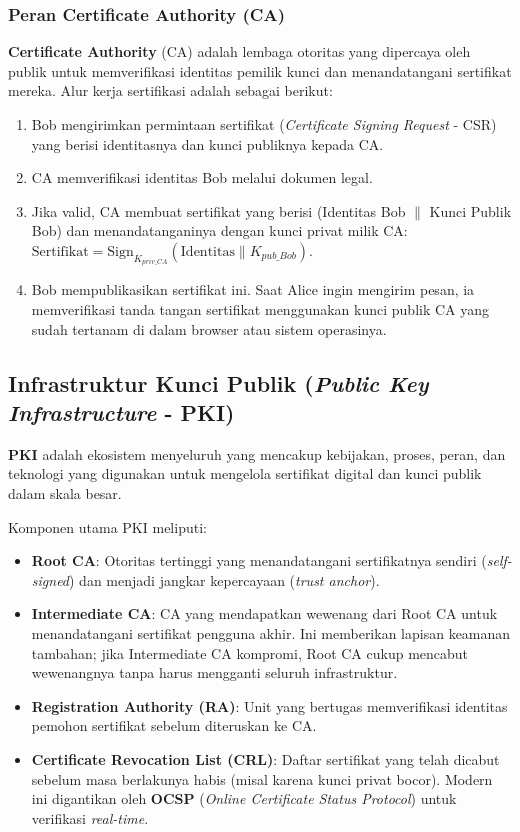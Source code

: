 \subsubsection{Peran Certificate Authority (CA)}
\textbf{Certificate Authority} (CA) adalah lembaga otoritas yang dipercaya oleh publik untuk memverifikasi identitas pemilik kunci dan menandatangani sertifikat mereka. Alur kerja sertifikasi adalah sebagai berikut:
\begin{enumerate}
    \item Bob mengirimkan permintaan sertifikat (\textit{Certificate Signing Request} - CSR) yang berisi identitasnya dan kunci publiknya kepada CA.
    \item CA memverifikasi identitas Bob melalui dokumen legal.
    \item Jika valid, CA membuat sertifikat yang berisi (Identitas Bob $\parallel$ Kunci Publik Bob) dan menandatanganinya dengan kunci privat milik CA: $\text{Sertifikat} = \text{Sign}_{K_{priv\_CA}}(\text{Identitas} \parallel K_{pub\_Bob})$.
    \item Bob mempublikasikan sertifikat ini. Saat Alice ingin mengirim pesan, ia memverifikasi tanda tangan sertifikat menggunakan kunci publik CA yang sudah tertanam di dalam browser atau sistem operasinya.
\end{enumerate}

\subsection{Infrastruktur Kunci Publik (\textit{Public Key Infrastructure} - PKI)}

\textbf{PKI} adalah ekosistem menyeluruh yang mencakup kebijakan, proses, peran, dan teknologi yang digunakan untuk mengelola sertifikat digital dan kunci publik dalam skala besar.

Komponen utama PKI meliputi:
\begin{itemize}
    \item \textbf{Root CA}: Otoritas tertinggi yang menandatangani sertifikatnya sendiri (\textit{self-signed}) dan menjadi jangkar kepercayaan (\textit{trust anchor}).
    \item \textbf{Intermediate CA}: CA yang mendapatkan wewenang dari Root CA untuk menandatangani sertifikat pengguna akhir. Ini memberikan lapisan keamanan tambahan; jika Intermediate CA kompromi, Root CA cukup mencabut wewenangnya tanpa harus mengganti seluruh infrastruktur.
    \item \textbf{Registration Authority (RA)}: Unit yang bertugas memverifikasi identitas pemohon sertifikat sebelum diteruskan ke CA.
    \item \textbf{Certificate Revocation List (CRL)}: Daftar sertifikat yang telah dicabut sebelum masa berlakunya habis (misal karena kunci privat bocor). Modern ini digantikan oleh \textbf{OCSP} (\textit{Online Certificate Status Protocol}) untuk verifikasi \textit{real-time}.
\end{itemize}

